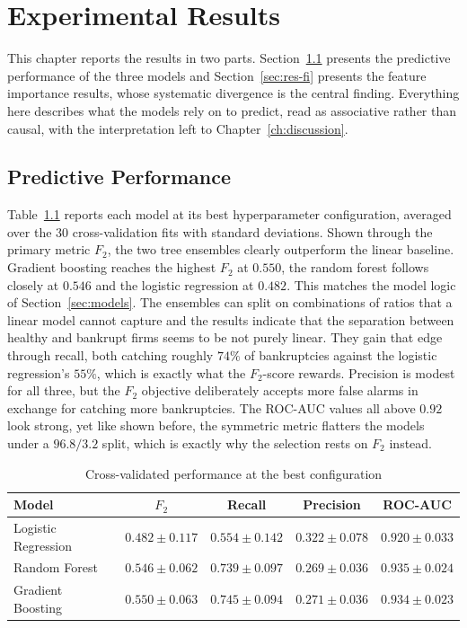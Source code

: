 \chapter{Experimental Results}
\label{ch:results}

This chapter reports the results in two parts. Section~\ref{sec:res-performance}
presents the predictive performance of the three models and
Section~\ref{sec:res-fi} presents the feature importance results, whose systematic
divergence is the central finding. Everything here describes what the models rely on
to predict, read as associative rather than causal, with the interpretation left to
Chapter~\ref{ch:discussion}.

\section{Predictive Performance}
\label{sec:res-performance}

Table~\ref{tab:performance} reports each model at its best hyperparameter
configuration, averaged over the $30$ cross-validation fits with standard deviations.
Shown through the primary metric $F_2$, the two tree ensembles clearly outperform the
linear baseline. Gradient boosting reaches the highest $F_2$ at $0.550$, the random
forest follows closely at $0.546$ and the logistic regression at $0.482$.
This matches the model logic of Section~\ref{sec:models}. The ensembles can
split on combinations of ratios that a linear model cannot capture and the results
indicate that the separation between healthy and bankrupt firms seems to be not purely linear. They
gain that edge through recall, both catching roughly $74\%$ of bankruptcies against
the logistic regression's $55\%$, which is exactly what the $F_2$-score rewards.
Precision is modest for all three, but the $F_2$ objective
deliberately accepts more false alarms in exchange for catching more
bankruptcies. The ROC-AUC values all above $0.92$ look strong, yet like shown before,
the symmetric metric flatters the models under a $96.8/3.2$ split,
which is exactly why the selection rests on $F_2$ instead.

\begin{table}[htbp]
  \centering
  \caption{Cross-validated performance at the best configuration}
  \label{tab:performance}
  \begin{tabular}{lcccc}
    \toprule
    \textbf{Model} & \textbf{$F_2$} & \textbf{Recall} & \textbf{Precision}
      & \textbf{ROC-AUC} \\
    \midrule
    Logistic Regression & $0.482 \pm 0.117$ & $0.554 \pm 0.142$ & $0.322 \pm 0.078$
      & $0.920 \pm 0.033$ \\
    Random Forest       & $0.546 \pm 0.062$ & $0.739 \pm 0.097$ & $0.269 \pm 0.036$
      & $0.935 \pm 0.024$ \\
    Gradient Boosting   & $\mathbf{0.550 \pm 0.063}$ & $0.745 \pm 0.094$ & $0.271 \pm 0.036$
      & $0.934 \pm 0.023$ \\
    \bottomrule
  \end{tabular}
\end{table}

